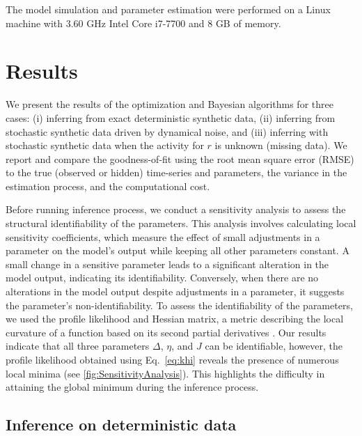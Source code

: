 \documentclass[preprint,11pt,authoryear]{elsarticle}
\begin{document}
The model simulation and parameter estimation were performed on a Linux machine with 3.60 GHz Intel Core i7-7700 and 8 GB of memory.






\section{Results}
\label{Results}

We present the results of the optimization and Bayesian algorithms for three cases: (i) inferring from exact deterministic synthetic data, (ii) inferring from stochastic synthetic data driven by dynamical noise, and (iii) inferring with stochastic synthetic data when the activity for $r$ is unknown (missing data).  We report and compare the goodness-of-fit using the root mean square error (RMSE) to the true (observed or hidden) time-series and parameters, the variance in the estimation process, and the computational cost.



Before running inference process, we conduct a sensitivity analysis to assess the structural identifiability of the parameters. This analysis involves calculating local sensitivity coefficients, which measure the effect of small adjustments in a parameter on the model's output while keeping all other parameters constant. A small change in a sensitive parameter leads to a significant alteration in the model output, indicating its identifiability. Conversely, when there are no alterations in the model output despite adjustments in a parameter, it suggests the parameter's non-identifiability. To assess the identifiability of the parameters, we used the profile likelihood \citep{Raue2009, Wieland2021} and Hessian matrix, a metric describing the local curvature of a function based on its second partial derivatives \citep{Hashemi2018, Hashemi2023}. Our results indicate that all three parameters $\Delta$, $\eta$, and $J$ can be identifiable, however, the profile likelihood obtained using Eq.~\ref{eq:khi} reveals the presence of numerous local minima (see \autoref{fig:SensitivityAnalysis}). This highlights the difficulty in attaining the global minimum during the inference process.



\subsection{Inference on deterministic data}
\end{document}
